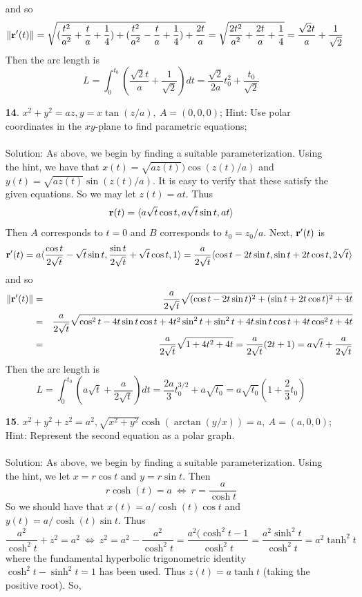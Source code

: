 \documentclass[12pt]{amsbook}
\newcommand{\la}{\langle}
\newcommand{\ra}{\rangle}
\begin{document}
\begin{enumerate}
  and so 
 $$\|{\bf r}'(t)\|=\sqrt{(\frac{t^2}{a^2}+\frac{t}{a}+\frac{1}{4})+(\frac{t^2}{a^2}-\frac{t}{a}+\frac{1}{4})+\frac{2t}{a}}=\sqrt{\frac{2t^2}{a^2}+\frac{2t}{a}+\frac{1}{4}}=\frac{\sqrt{2}t}{a}+\frac{1}{\sqrt{2}}$$
  Then the arc length is
  $$L=\int_0^{t_0}(\frac{\sqrt{2}t}{a}+\frac{1}{\sqrt{2}})dt=\frac{\sqrt{2}}{2a}t_0^2+\frac{t_0}{\sqrt{2}}$$
  \item[{\small\bf 14}.] $x^2+y^2=az, y=x\tan(z/a), \ A=(0,0,0)$; Hint: Use polar
coordinates in the $xy$-plane to find parametric equations;
 \\
 \\
  {\sc Solution}: As above, we begin by finding a suitable parameterization. Using the hint, we have that $x(t)=\sqrt{az(t)})\cos (z(t)/a)$ and $y(t)=\sqrt{az(t)}\sin (z(t)/a)$. It is easy to verify that these satisfy the given equations. So we may let $z(t)=at$. Thus 
$${\bf r}(t)=\la a\sqrt{t}\cos t, a\sqrt{t} \sin t, at \ra$$  
  Then $A$ corresponds to $t=0$ and $B$ corresponds to $t_0=z_0/a$. Next, ${\bf r}'(t)$ is
  $${\bf r}'(t)=a\la \frac{\cos t}{2\sqrt{t}}-\sqrt{t}\sin t, \frac{\sin t}{2\sqrt{t}}+\sqrt{t}\cos t, 1 \ra= \frac{a}{2\sqrt{t}}\la \cos t - 2t\sin t, \sin t +2t\cos t, 2\sqrt{t} \ra$$
  and so 
\begin{eqnarray*}
\|{\bf r}'(t)\|&=&\frac{a}{2\sqrt{t}}\sqrt{(\cos t - 2t\sin t)^2+(\sin t +2t\cos t)^2+4t}\\
&=&\frac{a}{2\sqrt{t}}\sqrt{\cos^2 t -4t\sin t \cos t +4t^2\sin^2 t+\sin^2 t +4t\sin t\cos t +4t\cos^2 t+4t}\\
&=&\frac{a}{2\sqrt{t}}\sqrt{1+4t^2+4t}=\frac{a}{2\sqrt{t}}(2t+1)=a\sqrt{t}+\frac{a}{2\sqrt{t}}
\end{eqnarray*}
  Then the arc length is
  $$L=\int_0^{t_0}(a\sqrt{t}+\frac{a}{2\sqrt{t}})dt=\frac{2a}{3}t_0^{3/2}+a\sqrt{t_0}=a\sqrt{t_0}(1+\frac{2}{3}t_0)$$
  \item[{\small\bf 15}.] $x^2+y^2+z^2=a^2, \sqrt{x^2+y^2}\cosh(\arctan(y/x))=a, \ A=(a,0,0)$; Hint: Represent the second equation as a polar graph.
  \\
  \\
  {\sc Solution}: As above, we begin by finding a suitable parameterization. Using the hint, we let $x=r\cos t$ and $y=r\sin t$. Then
$$r\cosh(t)=a \ \Leftrightarrow \ r=\frac{a}{\cosh t}$$
So we should have that $x(t)=a/\cosh(t)\cos t$ and $y(t)=a/\cosh(t)\sin t$. Thus
$$\frac{a^2}{\cosh^2 t} +z^2=a^2 \ \Leftrightarrow \ z^2=a^2-\frac{a^2}{\cosh^2 t} = \frac{a^2(\cosh^2 t -1 }{\cosh^2 t}=\frac{a^2\sinh^2 t}{\cosh^2 t}=a^2\tanh^2 t$$ 
  where the fundamental hyperbolic trigonometric identity $\cosh^2 t- \sinh^2 t=1$ has been used. Thus $z(t)=a\tanh t$ (taking the positive root). So,

\end{enumerate}
\end{document}

